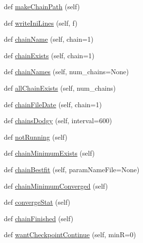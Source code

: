 \begin{DoxyCompactItemize}
def \mbox{\hyperlink{classparamgrid_1_1batchjob_1_1jobItem_af2b6c516384812d49454f2ee26082f66}{make\+Chain\+Path}} (self)
\item 
def \mbox{\hyperlink{classparamgrid_1_1batchjob_1_1jobItem_ac013be4523b3bc72635b183e498db58d}{write\+Ini\+Lines}} (self, f)
\item 
def \mbox{\hyperlink{classparamgrid_1_1batchjob_1_1jobItem_a94c6718acb448e4fe0a55ef0e80cf594}{chain\+Name}} (self, chain=1)
\item 
def \mbox{\hyperlink{classparamgrid_1_1batchjob_1_1jobItem_af221a166a73199e5228a24546e014f87}{chain\+Exists}} (self, chain=1)
\item 
def \mbox{\hyperlink{classparamgrid_1_1batchjob_1_1jobItem_a80e05d711d7f3324d6a8a71fd2442592}{chain\+Names}} (self, num\+\_\+chains=None)
\item 
def \mbox{\hyperlink{classparamgrid_1_1batchjob_1_1jobItem_a2aebd345765a90efdbcb15062b09e5ac}{all\+Chain\+Exists}} (self, num\+\_\+chains)
\item 
def \mbox{\hyperlink{classparamgrid_1_1batchjob_1_1jobItem_a6c477e458924df69f4d638a39e37a56c}{chain\+File\+Date}} (self, chain=1)
\item 
def \mbox{\hyperlink{classparamgrid_1_1batchjob_1_1jobItem_ad8f3e85e06dcdd714b54e5280232445f}{chains\+Dodgy}} (self, interval=600)
\item 
def \mbox{\hyperlink{classparamgrid_1_1batchjob_1_1jobItem_ac1129b5a9cac47d4044440c6f03eca75}{not\+Running}} (self)
\item 
def \mbox{\hyperlink{classparamgrid_1_1batchjob_1_1jobItem_af071571611898c1f7cf01209710bcd85}{chain\+Minimum\+Exists}} (self)
\item 
def \mbox{\hyperlink{classparamgrid_1_1batchjob_1_1jobItem_a58c7ab8e50b105e645388b81d0e26f5a}{chain\+Bestfit}} (self, param\+Name\+File=None)
\item 
def \mbox{\hyperlink{classparamgrid_1_1batchjob_1_1jobItem_a7c3b8c96fddc1cf62fd8d9b1a3f8cda7}{chain\+Minimum\+Converged}} (self)
\item 
def \mbox{\hyperlink{classparamgrid_1_1batchjob_1_1jobItem_afbcba65e1aeaf86c50b6e8804ce0932d}{converge\+Stat}} (self)
\item 
def \mbox{\hyperlink{classparamgrid_1_1batchjob_1_1jobItem_af5ab04f9c7520cac86ab2182b265979e}{chain\+Finished}} (self)
\item 
def \mbox{\hyperlink{classparamgrid_1_1batchjob_1_1jobItem_aa728ccb7030aaa62a0bc94544aac3997}{want\+Checkpoint\+Continue}} (self, minR=0)
\item 

\end{DoxyCompactItemize}
